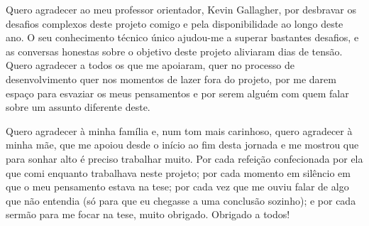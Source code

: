 
%

\begin{ntacknowledgements}

Quero agradecer ao meu professor orientador, Kevin Gallagher, por desbravar os desafios complexos deste projeto comigo e pela disponibilidade ao longo deste ano. O seu conhecimento técnico único ajudou-me a superar bastantes desafios, e as conversas honestas sobre o objetivo deste projeto aliviaram dias de tensão. Quero agradecer a todos os que me apoiaram, quer no processo de desenvolvimento quer nos momentos de lazer fora do projeto, por me darem espaço para esvaziar os meus pensamentos e por serem alguém com quem falar sobre um assunto diferente deste.

Quero agradecer à minha família e, num tom mais carinhoso, quero agradecer à minha mãe, que me apoiou desde o início ao fim desta jornada e me mostrou que para sonhar alto é preciso trabalhar muito. Por cada refeição confecionada por ela que comi enquanto trabalhava neste projeto; por cada momento em silêncio em que o meu pensamento estava na tese; por cada vez que me ouviu falar de algo que não entendia (só para que eu chegasse a uma conclusão sozinho); e por cada sermão para me focar na tese, muito obrigado. Obrigado a todos!

\end{ntacknowledgements}